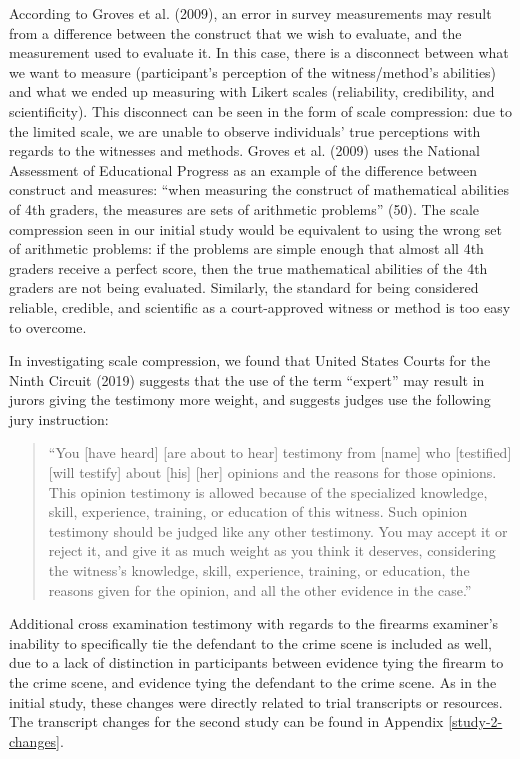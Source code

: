 \documentclass[print]{nuthesis}
\begin{document}
According to Groves et al. (2009), an error in survey measurements may result from a difference between the construct that we wish to evaluate, and the measurement used to evaluate it.
In this case, there is a disconnect between what we want to measure (participant's perception of the witness/method's abilities) and what we ended up measuring with Likert scales (reliability, credibility, and scientificity).
This disconnect can be seen in the form of scale compression: due to the limited scale, we are unable to observe individuals' true perceptions with regards to the witnesses and methods.
Groves et al. (2009) uses the National Assessment of Educational Progress as an example of the difference between construct and measures: ``when measuring the construct of mathematical abilities of 4th graders, the measures are sets of arithmetic problems'' (50).
The scale compression seen in our initial study would be equivalent to using the wrong set of arithmetic problems: if the problems are simple enough that almost all 4th graders receive a perfect score, then the true mathematical abilities of the 4th graders are not being evaluated.
Similarly, the standard for being considered reliable, credible, and scientific as a court-approved witness or method is too easy to overcome.

In investigating scale compression, we found that United States Courts for the Ninth Circuit (2019) suggests that the use of the term ``expert'' may result in jurors giving the testimony more weight, and suggests judges use the following jury instruction:

\begin{quote}
``You {[}have heard{]} {[}are about to hear{]} testimony from {[}name{]} who {[}testified{]} {[}will testify{]} about {[}his{]} {[}her{]} opinions and the reasons for those opinions. This opinion testimony is allowed because of the specialized knowledge, skill, experience, training, or education of this witness.
Such opinion testimony should be judged like any other testimony. You may accept it or reject it, and give it as much weight as you think it deserves, considering the witness's knowledge, skill, experience, training, or education, the reasons given for the opinion, and all the other evidence in the case.''
\end{quote}

Additional cross examination testimony with regards to the firearms examiner's inability to specifically tie the defendant to the crime scene is included as well, due to a lack of distinction in participants between evidence tying the firearm to the crime scene, and evidence tying the defendant to the crime scene.
As in the initial study, these changes were directly related to trial transcripts or resources.
The transcript changes for the second study can be found in Appendix \ref{study-2-changes}.
\end{document}
